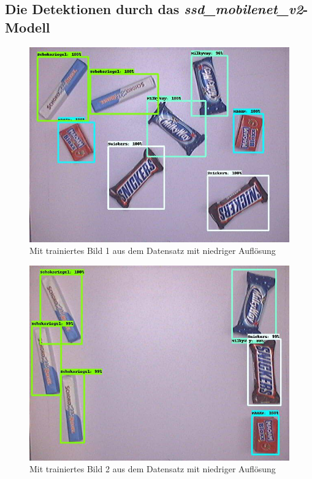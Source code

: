     \subsection{Die Detektionen durch das \textit{ssd\_mobilenet\_v2}-Modell}
    
    \begin{figure}[H]
        \vspace{-5mm}
        \centering
        \includegraphics[angle = 90, height = 0.85\textheight]{Bilder/models/model_comparison/ssd_mobilenet_v2_fpnlite_640x640_coco17_tpu-8/trained_1.jpg}
        \caption{Mit trainiertes Bild 1 aus dem Datensatz mit niedriger Auflösung}
    \end{figure}
    
    \begin{figure}[H]
        \centering
        \includegraphics[angle = 90, width = \textwidth]{Bilder/models/model_comparison/ssd_mobilenet_v2_fpnlite_640x640_coco17_tpu-8/trained_2.jpg}
        \caption{Mit trainiertes Bild 2 aus dem Datensatz mit niedriger Auflösung}
    \end{figure}
    
